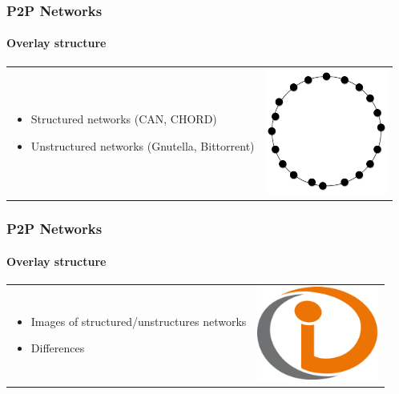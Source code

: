 \begin{frame}
\frametitle{P2P Networks}
\framesubtitle{Overlay structure}
\begin{table}
\begin{tabular}{p{7cm}p{3cm}}
\begin{itemize}
    \item Structured networks (CAN, CHORD)
    \item Unstructured networks (Gnutella, Bittorrent)
\end{itemize}
&
\vspace{1.5cm}
\includegraphics[width=4cm]{img/p2p-structured}\\
\end{tabular}
\end{table}
\end{frame}

\begin{frame}
\frametitle{P2P Networks}
\framesubtitle{Overlay structure}
\begin{table}
\begin{tabular}{p{7cm}p{3cm}}
\begin{itemize}
    \item Images of structured/unstructures networks
    \item Differences
\end{itemize}
&
\vspace{1.5cm}
\includegraphics[width=4cm]{img/example}\\
\end{tabular}
\end{table}
\end{frame}

